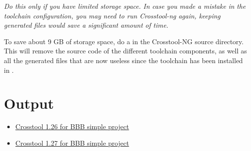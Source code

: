 {\em Do this only if you have limited storage space. In case you made a
mistake in the toolchain configuration, you may need to run Crosstool-ng
again, keeping generated files would save a significant amount of time.}

To save about 9 GB of storage space, do a  in the
Crosstool-NG source directory. This will remove the source code of the
different toolchain components, as well as all the generated files
that are now useless since the toolchain has been installed in
.

\section{Output}

\begin{itemize}
\item \href{https://github.com/ngocho31/crosstool-ng/tree/bbb_v1.26.0}{Crosstool 1.26 for BBB simple project}
\item \href{https://github.com/ngocho31/crosstool-ng/tree/bbb_v1.27.0}{Crosstool 1.27 for BBB simple project}
\end{itemize}
